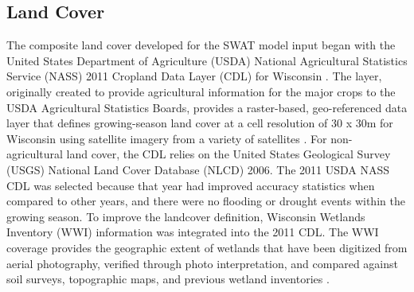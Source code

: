 \subsection{Land Cover}\label{sec:land_cover}
The composite land cover developed for the SWAT model input began with the United States Department of Agriculture (USDA) National Agricultural Statistics Service (NASS) 2011 Cropland Data Layer (CDL) for Wisconsin . The layer, originally created to provide agricultural information for the major crops to the USDA Agricultural Statistics Boards, provides a raster-based, geo-referenced data layer that defines growing-season land cover at a cell resolution of 30 x 30m for Wisconsin using satellite imagery from a variety of satellites . For non-agricultural land cover, the CDL relies on the United States Geological Survey (USGS) National Land Cover Database (NLCD) 2006. The 2011 USDA NASS CDL was selected because that year had improved accuracy statistics when compared to other years, and there were no flooding or drought events within the growing season. To improve the landcover definition, Wisconsin Wetlands Inventory (WWI) information was integrated into the 2011 CDL. The WWI coverage provides the geographic extent of wetlands that have been digitized from aerial photography, verified through photo interpretation, and compared against soil surveys, topographic maps, and previous wetland inventories .

